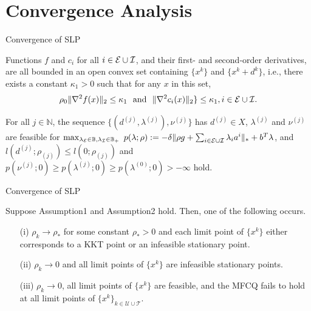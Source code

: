 \documentclass[8pt]{beamer}
\begin{document}
\section[Convergence Analysis]{Convergence Analysis}

	\begin{frame}{Convergence of SLP}
		\begin{assumption}\label{ass.algorithm}
			Functions $f$ and $c_i$ for all $i \in {\cal E}\cup{\cal I}$, and their first- and second-order  derivatives, are all  bounded in an open convex set containing $\{x^k\}$ and $\{x^k+d^k\}$, i.e., there exists a constant  $\kappa_1>0$  such that  for any $x$ in this set, 
			\[  \rho_0\|\nabla^2f(x)\|_2 \le \kappa_1\ \text{  and  }\  \|\nabla^2c_i(x)\|_2 \} \le \kappa_1, i\in{\cal E}\cup{\cal I}.\] 
		\end{assumption}
		\vfill
		\begin{assumption}
			For all $j \in \mathbb{N}$, the sequence $\{(d^{(j)},\lambda^{(j)}), \nu^{(j)}\}$ has $d^{(j)} \in X$, $\lambda^{(j)}$ and $\nu^{(j)}$ are feasible for $\max_{\lambda_{{\cal E}} \in \mathbb{B}, \lambda_{{\cal I}}\in\mathbb{B}_+}\ p(\lambda; \rho):= -  \delta\|\rho g+\sum_{i\in{\cal E}\cup{\cal I}}\lambda_i a^i \|_* + b^T \lambda$,  and  $l(d^{(j)}; \rho_{(j)}) \leq l(0; \rho_{(j)}) $ and $p(\nu^{(j)}; 0) \geq p(\lambda^{(j)}; 0) \geq p(\lambda^{(0)}; 0) > - \infty$ hold.
		\end{assumption}
		\vfill
	\end{frame}

	\begin{frame}{Convergence of SLP}
		\vfill
		\begin{theorem}  Suppose Assumption1 and Assumption2 hold. Then, one of the following occurs.
		\begin{enumerate}
			\item[(i)]  $\rho_k \to \rho_*$ for some constant $\rho_*>0$ and each limit point of $\{x^k\}$ either corresponds to a KKT point or an infeasible stationary point.
			\item[(ii)] $\rho_k \to 0$ and all limit points of $\{x^k\}$ are infeasible stationary points.
			\item[(iii)]  $\rho_k \to 0$, all limit points of $\{x^k\}$ are feasible, and the MFCQ fails to hold at all limit points of $\{x^k\}_{k\in\mathcal{U} \cup\mathcal{T}}$.			
		\end{enumerate}\end{theorem}
	\end{frame}
\end{document}
